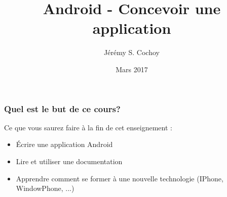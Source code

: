 \documentclass{beamer}
\begin{document}
\title{Android - Concevoir une application}
\author{Jérémy S. Cochoy}
\date{Mars 2017}

\begin{frame}
\titlepage
\end{frame}

\begin{frame}
\tableofcontents
\end{frame}

\begin{frame}
\frametitle{Quel est le but de ce cours?}

\begin{block}{Ce que vous saurez faire à la fin de cet enseignement :}

	\begin{itemize}
		\item Écrire une application Android
		\item Lire et utiliser une documentation
		\item Apprendre comment se former à une nouvelle technologie (IPhone, WindowPhone, ...)
	\end{itemize}

\end{block}

\end{frame}
\end{document}
